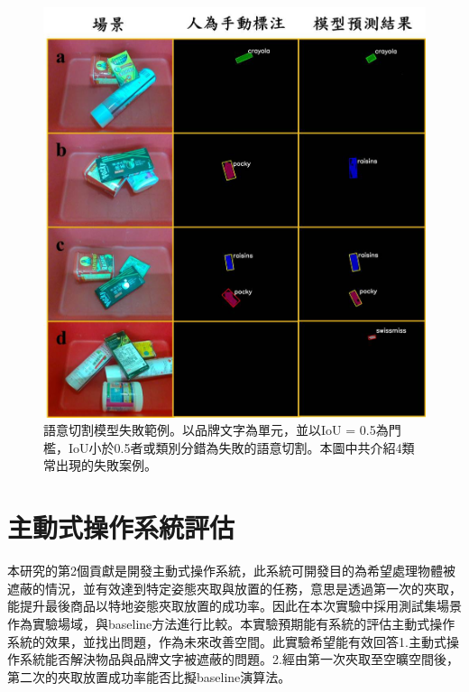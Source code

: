 \begin{figure}[H]
	\centering
	\includegraphics[height=!, width=1.0\linewidth, keepaspectratio=true]
	{./figures/failure_case_v2.jpg}
  \caption{語意切割模型失敗範例。以品牌文字為單元，並以IoU = 0.5為門檻，IoU小於0.5者或類別分錯為失敗的語意切割。本圖中共介紹4類常出現的失敗案例。}
  \label{figure:failure_case}
\end{figure}

\section{主動式操作系統評估}
本研究的第2個貢獻是開發主動式操作系統，此系統可開發目的為希望處理物體被遮蔽的情況，並有效達到特定姿態夾取與放置的任務，意思是透過第一次的夾取，能提升最後商品以特地姿態夾取放置的成功率。因此在本次實驗中採用測試集場景作為實驗場域，與baseline方法進行比較。本實驗預期能有系統的評估主動式操作系統的效果，並找出問題，作為未來改善空間。此實驗希望能有效回答1.主動式操作系統能否解決物品與品牌文字被遮蔽的問題。2.經由第一次夾取至空曠空間後，第二次的夾取放置成功率能否比擬baseline演算法。

